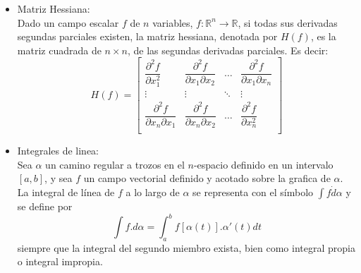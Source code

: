 \documentclass[a4paper, 12pt]{article}
\begin{document}
\begin{itemize}
\item Matriz Hessiana: \\
Dado un campo escalar $f$ de $n$ variables, $f: \mathbb{R}^n \to \mathbb{R}$, si todas sus derivadas segundas parciales existen, la matriz hessiana, denotada por $H(f)$, es la matriz cuadrada de $n\times n$, de las segundas derivadas parciales. Es decir: \\

\[H(f)= \left[ \begin{array}{cccc}
\dfrac{\partial^2 f}{\partial x_1^2} & \dfrac{\partial^2 f}{\partial x_1 \partial x_2} & \dots & \dfrac{\partial^2 f}{\partial x_1 \partial x_n} \\
\vdots & \vdots  & \ddots & \vdots \\
\dfrac{\partial^2 f}{\partial x_n \partial x_1} & \dfrac{\partial^2 f}{\partial x_n \partial x_2} & \dots & \dfrac{\partial^2 f}{\partial x_n^2} \\ \end{array} \right]\] 



\item Integrales de linea: \\
Sea $\alpha$ un camino regular a trozos en el $n$-espacio definido en un intervalo $[a,b]$, y sea $f$ un campo vectorial definido y acotado sobre la grafica de $\alpha$. La integral de línea de $f$ a lo largo de $\alpha$ se representa con el símbolo $\int f \dot d\alpha$ y se define por \\
$$\int f . d\alpha = \int_a^b f[\alpha(t)] . \alpha'(t) dt$$
siempre que la integral del segundo miembro exista, bien como integral propia o integral impropia.





\newpage




\end{itemize}
\end{document}

